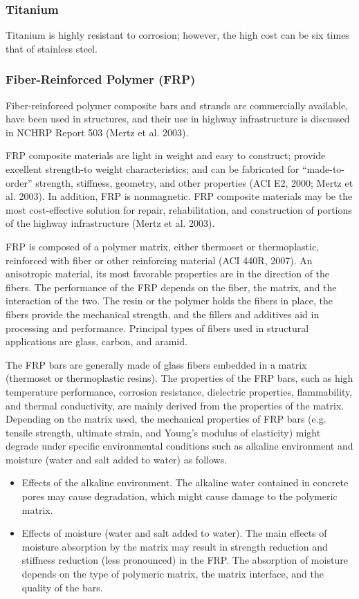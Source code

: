 \subsubsection{Titanium}

Titanium is highly resistant to corrosion; however, the high cost can be six times that of stainless steel.


\subsubsection{Fiber-Reinforced Polymer (FRP)}
Fiber-reinforced polymer composite bars and strands are commercially available, have been used in structures, and their use in highway infrastructure is discussed in NCHRP Report 503 (Mertz et al. 2003).

FRP composite materials are light in weight and easy to construct; provide excellent strength-to weight
characteristics; and can be fabricated for “made-to-order” strength, stiffness, geometry, and other properties (ACI E2,
2000; Mertz et al. 2003). In addition, FRP is nonmagnetic. FRP composite materials may be the most cost-effective
solution for repair, rehabilitation, and construction of portions of the highway infrastructure (Mertz et al. 2003).

FRP is composed of a polymer matrix, either thermoset or thermoplastic, reinforced with fiber or other
reinforcing material (ACI 440R, 2007). An anisotropic material, its most favorable properties are in the direction of
the fibers. The performance of the FRP depends on the fiber, the matrix, and the interaction of the two. The resin or
the polymer holds the fibers in place, the fibers provide the mechanical strength, and the fillers and additives aid in
processing and performance. Principal types of fibers used in structural applications are glass, carbon, and aramid.

The FRP bars are generally made of glass fibers embedded in a matrix (thermoset or thermoplastic resins). The
properties of the FRP bars, such as high temperature performance, corrosion resistance, dielectric properties,
flammability, and thermal conductivity, are mainly derived from the properties of the matrix. Depending on the
matrix used, the mechanical properties of FRP bars (e.g. tensile strength, ultimate strain, and Young’s modulus of
elasticity) might degrade under specific environmental conditions such as alkaline environment and moisture (water
and salt added to water) as follows.

\begin{itemize}
  \item Effects of the alkaline environment. The alkaline water contained in concrete pores may cause degradation, which might cause damage to the polymeric matrix.
  \item Effects of moisture (water and salt added to water). The main effects of moisture absorption by the matrix may result in strength reduction and stiffness reduction (less pronounced) in the FRP. The absorption of moisture depends on the type of polymeric matrix, the matrix interface, and the quality of the bars.
\end{itemize}

